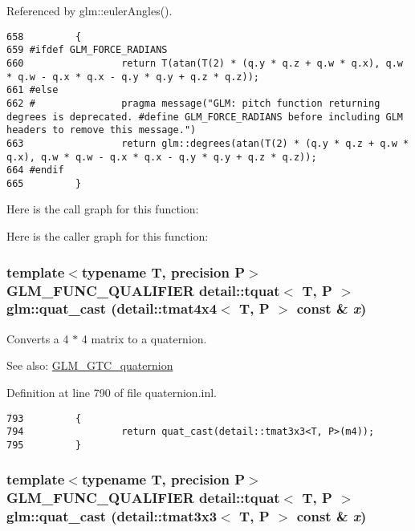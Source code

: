 Referenced by glm::eulerAngles().

\begin{Code}\begin{verbatim}658         {
659 #ifdef GLM_FORCE_RADIANS
660                 return T(atan(T(2) * (q.y * q.z + q.w * q.x), q.w * q.w - q.x * q.x - q.y * q.y + q.z * q.z));
661 #else
662 #               pragma message("GLM: pitch function returning degrees is deprecated. #define GLM_FORCE_RADIANS before including GLM headers to remove this message.")
663                 return glm::degrees(atan(T(2) * (q.y * q.z + q.w * q.x), q.w * q.w - q.x * q.x - q.y * q.y + q.z * q.z));
664 #endif
665         }
\end{verbatim}
\end{Code}




Here is the call graph for this function:

Here is the caller graph for this function:\hypertarget{group__gtc__quaternion_ge2011ef54746786bc5a93314dfcf54b5}{
\subsubsection[quat\_\-cast]{\setlength{\rightskip}{0pt plus 5cm}template$<$typename T, precision P$>$ GLM\_\-FUNC\_\-QUALIFIER detail::tquat$<$ T, P $>$ glm::quat\_\-cast (detail::tmat4x4$<$ T, P $>$ const \& {\em x})}}
\label{group__gtc__quaternion_ge2011ef54746786bc5a93314dfcf54b5}


Converts a 4 $\ast$ 4 matrix to a quaternion.

\begin{Desc}
\item[See also:]\hyperlink{group__gtc__quaternion}{GLM\_\-GTC\_\-quaternion} \end{Desc}


Definition at line 790 of file quaternion.inl.

\begin{Code}\begin{verbatim}793         {
794                 return quat_cast(detail::tmat3x3<T, P>(m4));
795         }
\end{verbatim}
\end{Code}


\hypertarget{group__gtc__quaternion_ga615768cdd09816fd42da38f484fb4c0}{
\subsubsection[quat\_\-cast]{\setlength{\rightskip}{0pt plus 5cm}template$<$typename T, precision P$>$ GLM\_\-FUNC\_\-QUALIFIER detail::tquat$<$ T, P $>$ glm::quat\_\-cast (detail::tmat3x3$<$ T, P $>$ const \& {\em x})}}
\label{group__gtc__quaternion_ga615768cdd09816fd42da38f484fb4c0}


